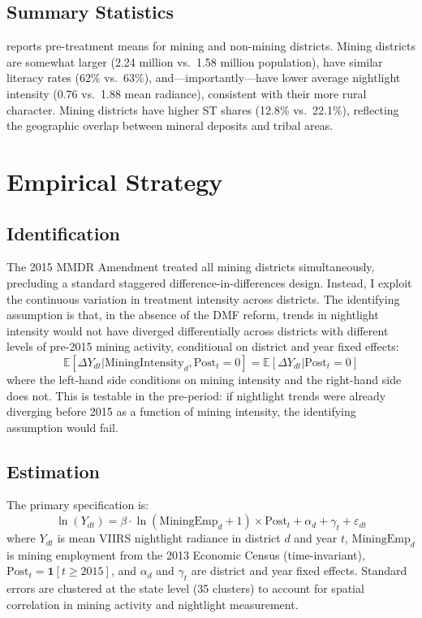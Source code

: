 \documentclass[12pt]{article}
\newcommand{\E}{\mathbb{E}}
\begin{document}
\subsection{Summary Statistics}

 reports pre-treatment means for mining and non-mining districts. Mining districts are somewhat larger (2.24 million vs.\ 1.58 million population), have similar literacy rates (62\% vs.\ 63\%), and---importantly---have lower average nightlight intensity (0.76 vs.\ 1.88 mean radiance), consistent with their more rural character. Mining districts have higher ST shares (12.8\% vs.\ 22.1\%), reflecting the geographic overlap between mineral deposits and tribal areas.



\section{Empirical Strategy}

\subsection{Identification}

The 2015 MMDR Amendment treated all mining districts simultaneously, precluding a standard staggered difference-in-differences design. Instead, I exploit the continuous variation in treatment intensity across districts. The identifying assumption is that, in the absence of the DMF reform, trends in nightlight intensity would not have diverged differentially across districts with different levels of pre-2015 mining activity, conditional on district and year fixed effects:
\begin{equation}
  \E[\Delta Y_{dt} | \text{MiningIntensity}_d, \text{Post}_t = 0] = \E[\Delta Y_{dt} | \text{Post}_t = 0]
\end{equation}
where the left-hand side conditions on mining intensity and the right-hand side does not. This is testable in the pre-period: if nightlight trends were already diverging before 2015 as a function of mining intensity, the identifying assumption would fail.

\subsection{Estimation}

The primary specification is:
\begin{equation}
  \ln(Y_{dt}) = \beta \cdot \ln(\text{MiningEmp}_d + 1) \times \text{Post}_t + \alpha_d + \gamma_t + \varepsilon_{dt}
  \label{eq:main}
\end{equation}
where $Y_{dt}$ is mean VIIRS nightlight radiance in district $d$ and year $t$, $\text{MiningEmp}_d$ is mining employment from the 2013 Economic Census (time-invariant), $\text{Post}_t = \mathbf{1}[t \geq 2015]$, and $\alpha_d$ and $\gamma_t$ are district and year fixed effects. Standard errors are clustered at the state level (35 clusters) to account for spatial correlation in mining activity and nightlight measurement.
\end{document}
